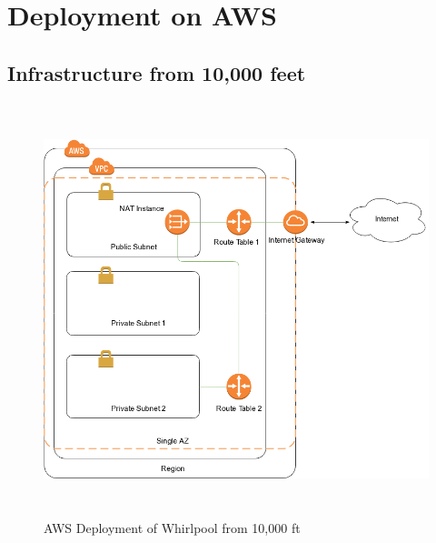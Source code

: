 \chapter{Deployment on AWS}
\section{Infrastructure from 10,000 feet}
\begin{figure}[h!]
  \centering
  \includegraphics[width=20cm,height=12cm,keepaspectratio]{../media/crawler/ten-thousand-feet-aws.png}
  \caption{AWS Deployment of Whirlpool from 10,000 ft}
\end{figure}

\pagebreak